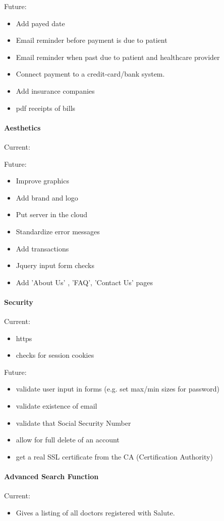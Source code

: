 \documentclass[12pt]{report}
\begin{document}
Future:
\begin{itemize}
\item Add payed date
\item Email reminder before payment is due to patient
\item Email reminder when past due to patient and healthcare provider
\item Connect payment to a credit-card/bank system.
\item Add insurance companies
\item pdf receipts of bills
\end{itemize}

\paragraph{Aesthetics}
Current:

Future: 
\begin{itemize}
\item Improve graphics
\item Add brand and logo
\item Put server in the cloud
\item Standardize error messages
\item Add transactions
\item Jquery input form checks
\item Add 'About Us' , 'FAQ', 'Contact Us' pages 
\end{itemize}

\paragraph{Security}
Current:
\begin{itemize}
\item https
\item checks for session cookies
\end{itemize}
Future: 
\begin{itemize}
\item validate user input in forms (e.g. set max/min sizes for password)
\item validate existence of email
\item validate that Social Security Number
\item allow for full delete of an account
\item get a real SSL certificate from the CA (Certification Authority)
\end{itemize}

\paragraph{Advanced Search Function}
Current:
\begin{itemize}
\item Gives a listing of all doctors registered with Salute.
\end{itemize}
\end{document}
